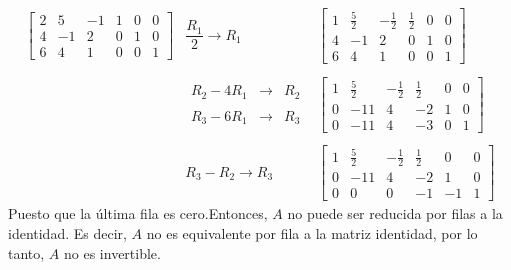 \begin{enumerate}[\bfseries 1.]
	$$
	\begin{array}{rcl}
	    \left[
		\begin{array}{rrr|rrr}
		    2 & 5 & -1 & 1 & 0 & 0\\
		    4 & -1 & 2 & 0 & 1 & 0\\
		    6 & 4 & 1 & 0 & 0 & 1
		\end{array}
	    \right]
	    &\dfrac{R_1}{2}\to R_1&
	    \left[
		\begin{array}{rrr|rrr}
		    1 & \frac{5}{2} & -\frac{1}{2} & \frac{1}{2} & 0 & 0\\
		    4 & -1 & 2 & 0 & 1 & 0\\
		    6 & 4 & 1 & 0 & 0 & 1
		\end{array}
	    \right]\\\\
	    &
	    \begin{array}{rcl}
		R_2-4R_1 &\to & R_2\\\\
		R_3-6R_1 &\to & R_3
	    \end{array}
	    &
	    \left[
		\begin{array}{rrr|rrr}
		    1 & \frac{5}{2} & -\frac{1}{2} & \frac{1}{2} & 0 & 0\\
		    0 & -11 & 4 & -2 & 1 & 0\\
		    0 & -11 & 4 & -3 & 0 & 1
		\end{array}
	    \right]\\\\
	    & R_3-R_2\to R_3&
	    \left[
		\begin{array}{rrr|rrr}
		    1 & \frac{5}{2} & -\frac{1}{2} & \frac{1}{2} & 0 & 0\\
		    0 & -11 & 4 & -2 & 1 & 0\\
		    0 & 0 & 0 & -1 & -1 & 1
		\end{array}
	    \right]
	\end{array}
	$$
	Puesto que la última fila es cero.Entonces, $A$ no puede ser reducida por filas a la identidad. Es decir, $A$ no es equivalente por fila a la matriz identidad, por lo tanto, $A$ no es invertible.\\


\end{enumerate}
